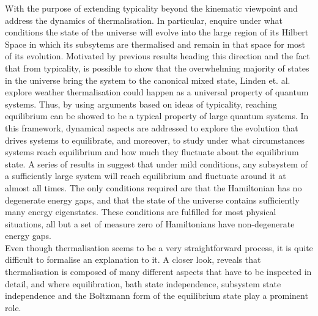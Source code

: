  
\indent With the purpose of extending typicality beyond the kinematic viewpoint and address the dynamics of thermalisation. In particular,  enquire under what conditions the state of the universe will evolve into the large region of its Hilbert Space in which its subsytems are thermalised and remain in that space for most of its evolution. Motivated by previous results heading this direction\cite{tasaki_quantum_1998,gemmer_thermalization_2006} and the fact that from typicality, is possible to show that the overwhelming majority of states in the universe bring the system to the canonical mixed state, Linden et. al.\cite{linden_quantum_2009} explore weather thermalisation could happen as a universal property of quantum systems. Thus, by using arguments based on ideas of typicality, reaching equilibrium can be showed to be a typical property of large quantum systems. In this framework, dynamical aspects are addressed to explore the evolution that drives systems to equilibrate, and moreover, to study under what circumstances systems reach equilibrium and how much they fluctuate about the equilibrium state. A series of results in \cite{linden_quantum_2009,linden_speed_2010,malabarba_quantum_2014} suggest that under mild conditions, any subsystem of a sufficiently large system will reach equilibrium and fluctuate around it at almost all times. The only conditions required are that the Hamiltonian has no degenerate energy gaps, and that the state of the universe contains sufficiently many energy eigenstates. These conditions are fulfilled for most physical situations, all but a set of measure zero of Hamiltonians have non-degenerate energy gaps.\\



\indent Even though thermalisation seems to be a very straightforward process, it is quite difficult to formalise an explanation to it. A closer look, reveals that thermalisation is composed of many different aspects that have to be inspected in detail, and where equilibration, bath state independence, subsystem state independence and the Boltzmann form of the equilibrium state play a prominent role\cite{linden_quantum_2009}.\\

